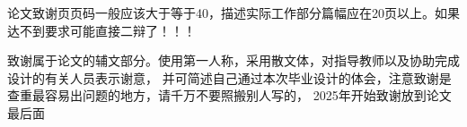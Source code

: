 \acknowledgement

论文致谢页页码一般应该大于等于40，描述实际工作部分篇幅应在20页以上。如果达不到要求可能直接二辩了！！！

致谢属于论文的辅文部分。使用第一人称，采用散文体，对指导教师以及协助完成设计的有关人员表示谢意，
并可简述自己通过本次毕业设计的体会，注意致谢是查重最容易出问题的地方，请千万不要照搬别人写的，
2025年开始致谢放到论文最后面

